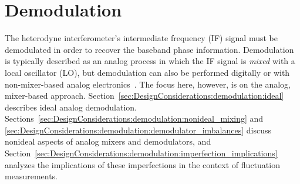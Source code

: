 \section{Demodulation}
\label{sec:DesignConsiderations:demodulation}
The heterodyne interferometer's intermediate frequency (IF) signal
must be demodulated in order to recover the baseband phase information.
Demodulation is typically described as an analog process
in which the IF signal is \emph{mixed} with a local oscillator (LO), but
demodulation can also be performed digitally
\cite{vanzeeland_rsi08, mlynek_fst12} or
with non-mixer-based analog electronics~\cite{mlynek_rsi17}.
The focus here, however, is on the analog, mixer-based approach.
Section~\ref{sec:DesignConsiderations:demodulation:ideal}
describes ideal analog demodulation.
Sections~\ref{sec:DesignConsiderations:demodulation:nonideal_mixing} and
\ref{sec:DesignConsiderations:demodulation:demodulator_imbalances}
discuss nonideal aspects of analog mixers and demodulators, and
Section~\ref{sec:DesignConsiderations:demodulation:imperfection_implications}
analyzes the implications of these imperfections
in the context of fluctuation measurements.


